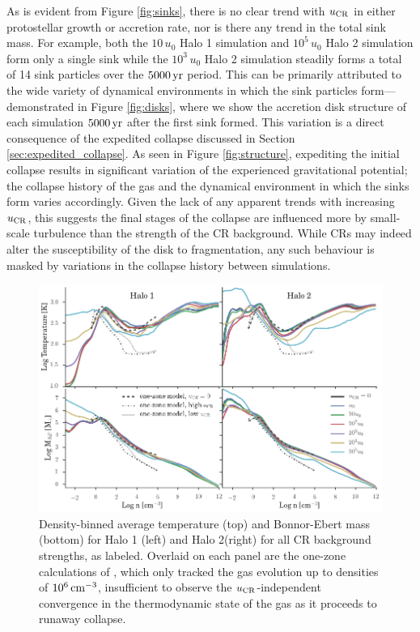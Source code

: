 \documentclass[usenatbib]{mn2e}
\newcommand{\cc}{\,{\rm cm}^{-3}}
\newcommand{\yr}{\,{\rm yr}}
\newcommand{\ucr}{{u}_{\rm \small CR}}
\begin{document}
As is evident from Figure \ref{fig:sinks}, there is no clear trend with $\ucr$ in either protostellar growth or accretion rate, nor is there any trend in the total sink mass.
For example, both the $10\,u_0$ Halo 1 simulation and $10^5\,u_0$ Halo 2 simulation form only a single sink while the $10^3\,u_0$ Halo 2 simulation steadily forms a total of 14 sink particles over the $5000\yr$ period.
This  can be primarily attributed to the wide variety of dynamical environments in which the sink particles form---demonstrated in Figure \ref{fig:disks}, where we show the accretion disk structure of each simulation $5000\yr$ after the first sink formed.
This variation is a direct consequence of the expedited collapse discussed in Section \ref{sec:expedited_collapse}. 
As seen in Figure \ref{fig:structure}, expediting the initial collapse results in significant variation of the experienced gravitational potential; the collapse history of the gas and the dynamical environment in which the sinks form varies accordingly.
Given the lack of any apparent trends with increasing $\ucr$, this suggests the final stages of the collapse are influenced more by small-scale turbulence than the strength of the CR background.
While CRs may indeed alter the susceptibility of the disk to fragmentation, any such behaviour is masked by variations in the collapse history between simulations.

\begin{figure}
\begin{center}
\includegraphics[width=1\textwidth]{figures/binned_T_Mbe/binned_T_Mbe}
\caption{\label{fig:Mbe}
Density-binned average temperature (top) and Bonnor-Ebert mass (bottom) for Halo 1 (left) and Halo 2(right) for all CR background strengths, as labeled.
Overlaid on each panel are the one-zone calculations of \citet{StacyBromm2007}, which only tracked the gas evolution up to densities of $10^6\cc$, insufficient to observe the $\ucr$-independent convergence in the thermodynamic state of the gas as it proceeds to runaway collapse.%
}
\end{center}
\end{figure}
\end{document}
